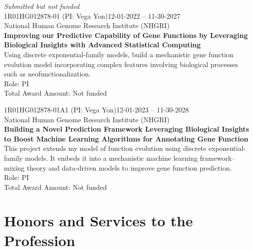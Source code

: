 \documentclass[letterpaper, 10pt]{article}
\renewcommand{\textbf}[1]{{\bfseries\color{teal}#1}}
\begin{document}
\noindent \textit{Submitted but not funded}\\

\noindent 1R01HG012878-01 (PI: Vega Yon)\hfill 12-01-2022 -- 11-30-2027\\
National Human Genome Research Institute (NHGRI)\\
\textbf{Improving our Predictive Capability of Gene Functions by Leveraging Biological Insights with Advanced Statistical Computing}\\
Using discrete exponential-family models, build a mechanistic gene function evolution model incorporating complex features involving biological processes such as neofunctionalization.\\
Role: PI\\
Total Award Amount: Not funded \vspace{.5cm}

\noindent 1R01HG012878-01A1	(PI: Vega Yon)\hfill 12-01-2023 -- 11-30-2028\\
National Human Genome Research Institute (NHGRI)\\
\textbf{Building a Novel Prediction Framework Leveraging Biological Insights to Boost Machine Learning Algorithms for Annotating Gene Function} \\
This project extends my model of function evolution using discrete exponential-family models. It embeds it into a mechanistic machine learning framework--mixing theory and data-driven models to improve gene function prediction.\\
Role: PI\\
Total Award Amount: Not funded \vspace{.5cm}



% 
% 

\section*{Honors and Services to the Profession}

\end{document}
